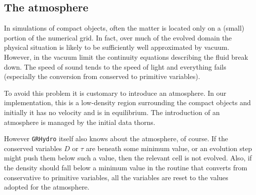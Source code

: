 \documentclass{article}
\begin{document}
\subsection{The atmosphere}
\label{sec:atmosphere}

In simulations of compact objects, often the matter is located only on a (small) portion of the
numerical grid. In fact, over much of the evolved domain the physical situation is likely to be
sufficiently well approximated by vacuum. However, in the vacuum limit the continuity equations
describing the fluid break down. The speed of sound tends to the speed of light and everything fails
(especially the conversion from conserved to primitive variables).

To avoid this problem it is customary to introduce an atmosphere. In our implementation, this is a
low-density region surrounding the compact objects and initially it has no velocity and is in equilibrium. The
introduction of an atmosphere is managed by the initial data thorns.

However {\tt GRHydro} itself also knows about the atmosphere, of course. If the conserved variables
$D$ or $\tau$ are beneath some minimum value, or an evolution step might push them below such a
value, then the relevant cell is not evolved. Also, if the density should fall below a minimum value
in the routine that converts from conservative to primitive variables, all the variables are reset
to the values adopted for the atmosphere.
\end{document}

